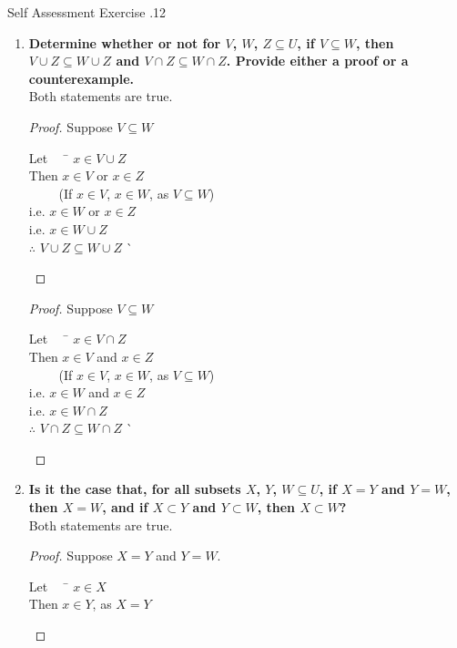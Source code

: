 \documentclass[../notes.tex]{subfiles}
\begin{document}
			\begin{exercise}{Self Assessment Exercise \thechapter.12}
				\begin{enumerate}
					\item \textbf{Determine whether or not for $V$, $W$, $Z \subseteq U$, if $V \subseteq W$, then $V \cup Z \subseteq W \cup Z$ and $V \cap Z \subseteq W \cap Z$. Provide either a proof or a counterexample.}\\
						Both statements are true.
						\begin{proof}
							Suppose $V \subseteq W$
							\begin{tabbing}
								Let $\quad$ \= $x \in V \cup Z$\\
								Then \> $x \in V$ or $x \in Z$\\
								\> $\qquad$ (If $x \in V$, $x \in W$, as $V \subseteq W$)\\
								i.e. \> $x \in W$ or $x \in Z$\\
								i.e. \> $x \in W \cup Z$\\
								$\therefore$ \> $V \cup Z \subseteq W \cup Z$ \`\qedhere
							\end{tabbing}
						\end{proof}
						\begin{proof}
							Suppose $V \subseteq W$
							\begin{tabbing}
								Let $\quad$ \= $x \in V \cap Z$\\
								Then \> $x \in V$ and $x \in Z$\\
								\> $\qquad$ (If $x \in V$, $x \in W$, as $V \subseteq W$)\\
								i.e. \> $x \in W$ and $x \in Z$\\
								i.e. \> $x \in W \cap Z$\\
								$\therefore$ \> $V \cap Z \subseteq W \cap Z$ \`\qedhere
							\end{tabbing}
						\end{proof}
					\item \textbf{Is it the case that, for all subsets $X$, $Y$, $W \subseteq U$, if $X = Y$ and $Y = W$, then $X = W$, and if $X \subset Y$ and $Y \subset W$, then $X \subset W$?}\\
						Both statements are true.
						\begin{proof}
							Suppose $X = Y$ and $Y = W$.
							\begin{tabbing}
								Let $\quad$ \= $x \in X$\\
								Then \> $x \in Y$, as $X = Y$\\

\end{tabbing}
\end{proof}
\end{enumerate}
\end{exercise}
\end{document}
